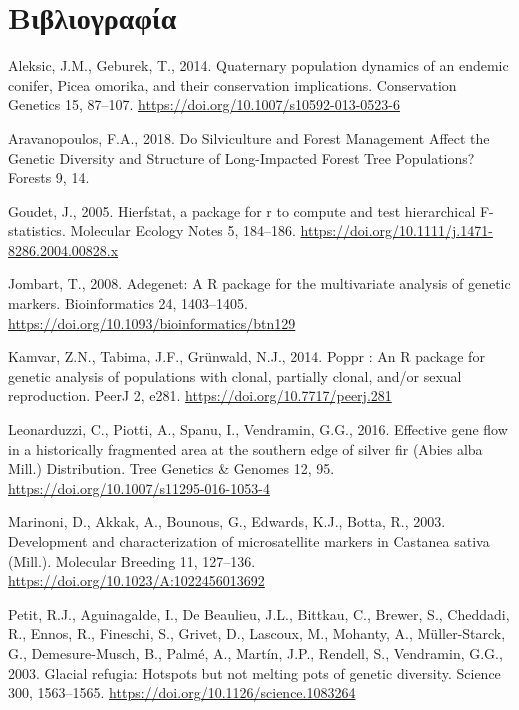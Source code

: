 \documentclass[12pt,a4paper,]{report}
\begin{document}
\section{Βιβλιογραφία}

\hypertarget{refs}{}
\leavevmode\hypertarget{ref-Aleksic2014}{}%
Aleksic, J.M., Geburek, T., 2014. Quaternary population dynamics of an
endemic conifer, Picea omorika, and their conservation implications.
Conservation Genetics 15, 87--107.
\url{https://doi.org/10.1007/s10592-013-0523-6}

\leavevmode\hypertarget{ref-Aravanopoulos2018a}{}%
Aravanopoulos, F.A., 2018. Do Silviculture and Forest Management Affect
the Genetic Diversity and Structure of Long-Impacted Forest Tree
Populations? Forests 9, 14.

\leavevmode\hypertarget{ref-goudet_hierfstat_2005}{}%
Goudet, J., 2005. Hierfstat, a package for r to compute and test
hierarchical F-statistics. Molecular Ecology Notes 5, 184--186.
\url{https://doi.org/10.1111/j.1471-8286.2004.00828.x}

\leavevmode\hypertarget{ref-Jombart2008}{}%
Jombart, T., 2008. Adegenet: A R package for the multivariate analysis
of genetic markers. Bioinformatics 24, 1403--1405.
\url{https://doi.org/10.1093/bioinformatics/btn129}

\leavevmode\hypertarget{ref-Kamvar2014}{}%
Kamvar, Z.N., Tabima, J.F., Grünwald, N.J., 2014. Poppr : An R package
for genetic analysis of populations with clonal, partially clonal,
and/or sexual reproduction. PeerJ 2, e281.
\url{https://doi.org/10.7717/peerj.281}

\leavevmode\hypertarget{ref-Leonarduzzi2016a}{}%
Leonarduzzi, C., Piotti, A., Spanu, I., Vendramin, G.G., 2016. Effective
gene flow in a historically fragmented area at the southern edge of
silver fir (Abies alba Mill.) Distribution. Tree Genetics \& Genomes 12,
95. \url{https://doi.org/10.1007/s11295-016-1053-4}

\leavevmode\hypertarget{ref-marinoni_development_2003}{}%
Marinoni, D., Akkak, A., Bounous, G., Edwards, K.J., Botta, R., 2003.
Development and characterization of microsatellite markers in Castanea
sativa (Mill.). Molecular Breeding 11, 127--136.
\url{https://doi.org/10.1023/A:1022456013692}

\leavevmode\hypertarget{ref-Petit2003}{}%
Petit, R.J., Aguinagalde, I., De Beaulieu, J.L., Bittkau, C., Brewer,
S., Cheddadi, R., Ennos, R., Fineschi, S., Grivet, D., Lascoux, M.,
Mohanty, A., Müller-Starck, G., Demesure-Musch, B., Palmé, A., Martín,
J.P., Rendell, S., Vendramin, G.G., 2003. Glacial refugia: Hotspots but
not melting pots of genetic diversity. Science 300, 1563--1565.
\url{https://doi.org/10.1126/science.1083264}
\end{document}
